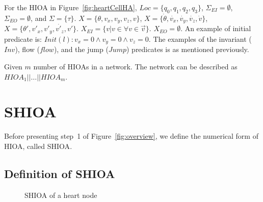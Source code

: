 For the \ac{HIOA} in Figure~\ref{fig:heartCellHA},
$Loc=\{q_{0},q_{1},q_{2},q_{3}\}$, $\Sigma_{EI} = \emptyset$,
$\Sigma_{EO}=\emptyset$, and
$\Sigma=\{\tau\}$. $X=\{\theta,v_{x},v_{y},v_{z},v\}$,
\mbox{$X=\{\dot{\theta},\dot{v_{x}},\dot{v_{y}},\dot{v_{z}},\dot{v}\}$},
\mbox{$X=\{\theta',{v'_{x}},{v'_{y}},\dot{v'_{z}},v'\}$}.
$X_{EI}=\{v | v \in \forall v \in \vec{v}\}$. $X_{EO}=\emptyset$. An
example of initial predicate is:
$Init(l): v_{x}=0 \wedge v_{y}=0 \wedge v_{z}=0$. The examples of the
invariant ($Inv$), flow ($flow$), and the jump ($Jump$) predicates is as
mentioned previously.


{\color{red} Given $m$ number of \acp{HIOA} in a network.  The network
  can be described as $HIOA_1 || \dots || HIOA_m$.}


\section{\acf{SHIOA}}
\label{sec:SHA}

Before presenting step~1 of Figure~\ref{fig:overview},
we define the numerical form of \ac{HIOA}, 
called \acf{SHIOA}.

\subsection{Definition of \acf{SHIOA}}
\label{sec:defSHA}

\begin{figure}
  \centering
  
  \caption{\acf{SHIOA} of a heart node \label{fig:heartCellSHA}}
\end{figure}


